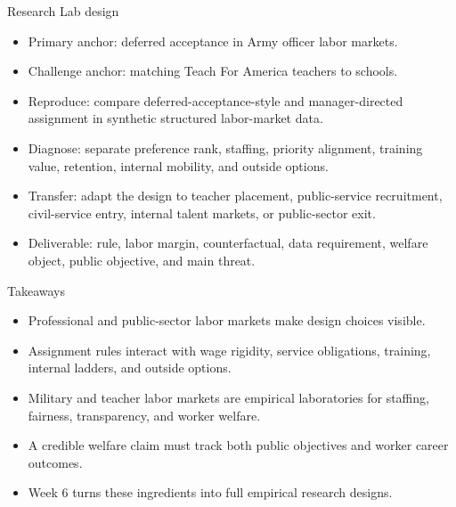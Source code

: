\documentclass[aspectratio=169,11pt]{beamer}
\begin{document}
\begin{frame}{Research Lab design}
\begin{itemize}
    \item Primary anchor: deferred acceptance in Army officer labor markets.
    \item Challenge anchor: matching Teach For America teachers to schools.
    \item Reproduce: compare deferred-acceptance-style and manager-directed assignment in synthetic structured labor-market data.
    \item Diagnose: separate preference rank, staffing, priority alignment, training value, retention, internal mobility, and outside options.
    \item Transfer: adapt the design to teacher placement, public-service recruitment, civil-service entry, internal talent markets, or public-sector exit.
    \item Deliverable: rule, labor margin, counterfactual, data requirement, welfare object, public objective, and main threat.
\end{itemize}
\end{frame}

\begin{frame}{Takeaways}
\begin{itemize}
    \item Professional and public-sector labor markets make design choices visible.
    \item Assignment rules interact with wage rigidity, service obligations, training, internal ladders, and outside options.
    \item Military and teacher labor markets are empirical laboratories for staffing, fairness, transparency, and worker welfare.
    \item A credible welfare claim must track both public objectives and worker career outcomes.
    \item Week 6 turns these ingredients into full empirical research designs.
\end{itemize}
\end{frame}
\end{document}
